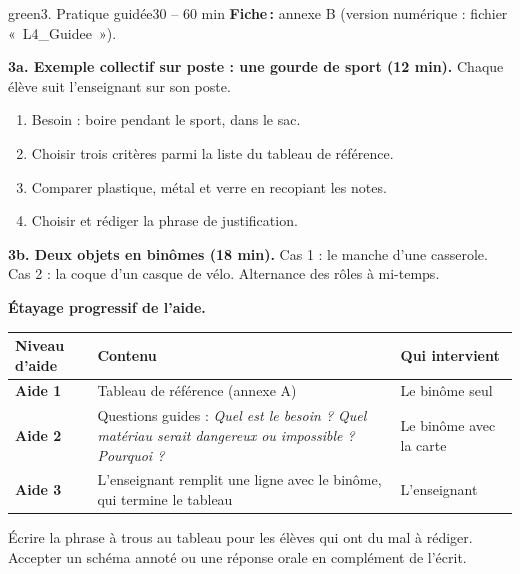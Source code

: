 \documentclass[11pt,a4paper]{article}
\begin{document}
\begin{etape}{green}{3. Pratique guidée}{30 -- 60 min}
\textbf{Fiche\,:} annexe B (version numérique : fichier «~L4\_Guidee~»).

\medskip
\textbf{3a. Exemple collectif sur poste : une gourde de sport (12 min).} Chaque élève suit l'enseignant sur son poste.
\begin{enumerate}
 \item Besoin : boire pendant le sport, dans le sac.
 \item Choisir trois critères parmi la liste du tableau de référence.
 \item Comparer plastique, métal et verre en recopiant les notes.
 \item Choisir et rédiger la phrase de justification.
\end{enumerate}

\textbf{3b. Deux objets en binômes (18 min).} Cas 1 : le manche d'une casserole. Cas 2 : la coque d'un casque de vélo. Alternance des rôles à mi-temps.

\textbf{Étayage progressif de l'aide.}
\begin{center}
\begin{tabularx}{\linewidth}{>{\bfseries}p{2.4cm}Y p{4.6cm}}
\toprule
Niveau d'aide & Contenu & Qui intervient\\
\midrule
Aide 1 & Tableau de référence (annexe A) & Le binôme seul\\
Aide 2 & Questions guides : \emph{Quel est le besoin ? Quel matériau serait dangereux ou impossible ? Pourquoi ?} & Le binôme avec la carte\\
Aide 3 & L'enseignant remplit une ligne avec le binôme, qui termine le tableau & L'enseignant\\
\bottomrule
\end{tabularx}
\end{center}

\begin{astuce}
Écrire la phrase à trous au tableau pour les élèves qui ont du mal à rédiger. Accepter un schéma annoté ou une réponse orale en complément de l'écrit.
\end{astuce}
\end{etape}
\end{document}
